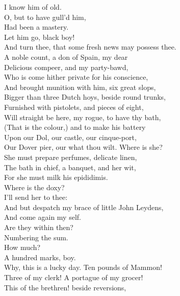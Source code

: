 \documentclass{memoir}
\begin{document}
\begin{drama*}
 I know him of old.\\
\subtlespeaks {} O, but to have gull'd him,\\
 Had been a mastery.\\
\facespeaks {} Let him go, black boy!\\
 And turn thee, that some fresh news may possess thee.\\
 A noble count, a don of Spain, my dear\\
 Delicious compeer, and my party-bawd,\\
 Who is come hither private for his conscience,\\
 And brought munition with him, six great slops,\\
 Bigger than three Dutch hoys, beside round trunks,\\
 Furnished with pistolets, and pieces of eight,\\
 Will straight be here, my rogue, to have thy bath,\\
 (That is the colour,) and to make his battery\\
 Upon our Dol, our castle, our cinque-port,\\
 Our Dover pier, our what thou wilt. Where is she?\\
 She must prepare perfumes, delicate linen,\\
 The bath in chief, a banquet, and her wit,\\
 For she must milk his epididimis.\\
 Where is the doxy?\\
\subtlespeaks {} I'll send her to thee:\\
 And but despatch my brace of little John Leydens,\\
 And come again my self.\\
\facespeaks {} Are they within then?\\
\subtlespeaks  Numbering the sum.\\
\facespeaks {} How much?\\
\subtlespeaks {} A hundred marks, boy.\\
\facespeaks  Why, this is a lucky day. Ten pounds of Mammon!\\
 Three of my clerk! A portague of my grocer!\\
 This of the brethren! beside reversions,\\

\end{drama*}
\end{document}
